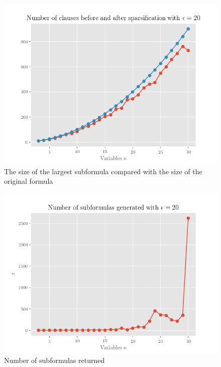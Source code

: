 \begin{figure}
    \centering
    \includegraphics[scale=0.7]{Chapter4/Figs/sparsification_20.png}
    \caption{The size of the largest subformula compared with the size of the original formula}
    \label{fig:sparsification}
\end{figure}
\begin{figure}
    \centering
    \includegraphics[scale=0.7]{Chapter4/Figs/subformulas_20.png}
    \caption{Number of subformulas returned}
    \label{fig:num_subformulas}
\end{figure}
